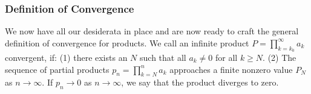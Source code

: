 
\subsubsection{Definition of Convergence}
We now have all our desiderata in place and are now ready to craft the general definition of convergence for products. We call an infinite product $P = \prod_{k = k_0}^{\infty} a_k$ convergent, if: (1) there exists an $N$ such that all $a_k \neq 0$ for all $k \geq N$. (2) The sequence of partial products $p_n = \prod_{k = N}^{n} a_k$ approaches a finite nonzero value $P_N$ as $n \rightarrow \infty$. If $p_n \rightarrow 0$ as $n \rightarrow \infty$, we say that the product diverges to zero.



